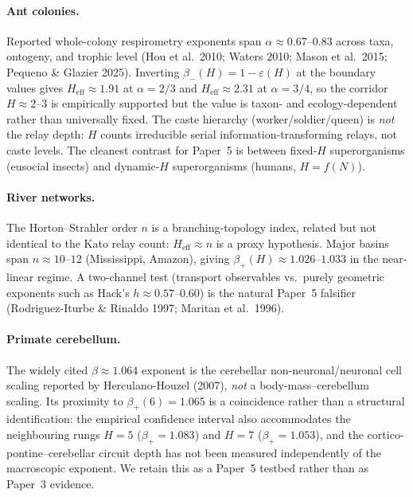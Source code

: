 \documentclass[11pt]{article}
\begin{document}
\paragraph{Ant colonies.}
Reported whole-colony respirometry exponents span $\alpha{\approx}0.67$--$0.83$ across taxa, ontogeny, and trophic level (Hou et al.~2010; Waters 2010; Mason et al.~2015; Pequeno \& Glazier 2025).  Inverting $\beta_{-}(H){=}1{-}\varepsilon(H)$ at the boundary values gives $H_{\mathrm{eff}}{\approx}1.91$ at $\alpha{=}2/3$ and $H_{\mathrm{eff}}{\approx}2.31$ at $\alpha{=}3/4$, so the corridor $H{\approx}2$--$3$ is empirically supported but the value is taxon- and ecology-dependent rather than universally fixed.  The caste hierarchy (worker/soldier/queen) is \emph{not} the relay depth: $H$ counts irreducible serial information-transforming relays, not caste levels.  The cleanest contrast for Paper~5 is between fixed-$H$ superorganisms (eusocial insects) and dynamic-$H$ superorganisms (humans, $H{=}f(N)$).

\paragraph{River networks.}
The Horton--Strahler order $n$ is a branching-topology index, related but not identical to the Kato relay count: $H_{\mathrm{eff}}{\approx}n$ is a proxy hypothesis.  Major basins span $n{\approx}10$--$12$ (Mississippi, Amazon), giving $\beta_{+}(H){\approx}1.026$--$1.033$ in the near-linear regime.  A two-channel test (transport observables vs.\ purely geometric exponents such as Hack's $h{\approx}0.57$--$0.60$) is the natural Paper~5 falsifier (Rodriguez-Iturbe \& Rinaldo 1997; Maritan et al.~1996).

\paragraph{Primate cerebellum.}
The widely cited $\beta{\approx}1.064$ exponent is the cerebellar non-neuronal/neuronal cell scaling reported by Herculano-Houzel (2007), \emph{not} a body-mass--cerebellum scaling.  Its proximity to $\beta_{+}(6){=}1.065$ is a coincidence rather than a structural identification: the empirical confidence interval also accommodates the neighbouring rungs $H{=}5$ ($\beta_{+}{=}1.083$) and $H{=}7$ ($\beta_{+}{=}1.053$), and the cortico-pontine--cerebellar circuit depth has not been measured independently of the macroscopic exponent.  We retain this as a Paper~5 testbed rather than as Paper~3 evidence.
\end{document}
